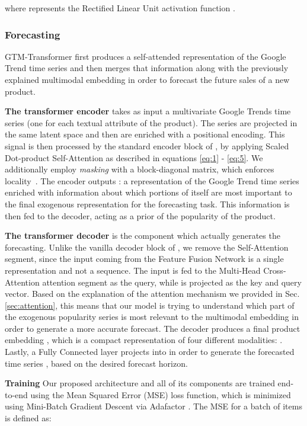 \documentclass{article}
\newcommand{\approachname}[0] {GTM-Transformer\xspace}
\begin{document}
where  represents the Rectified Linear Unit activation function \cite{agarap_relu}.


\subsubsection{Forecasting}
\approachname{} first produces a self-attended representation of the Google Trend time series and then merges that information along with the previously explained multimodal embedding in order to forecast the future sales of a new product.

\textbf{The transformer encoder} takes as input a multivariate Google Trends time series (one for each textual attribute of the product). The series are projected in the same latent space  and then are enriched with a positional encoding. This signal is then processed by the standard encoder block of \cite{vaswani2017attention}, by applying Scaled Dot-product Self-Attention as described in equations \ref{eq:1} - \ref{eq:5}. We additionally employ \emph{masking} with a block-diagonal matrix, which enforces locality~\cite{rae-razavi-2020-transformers}. The encoder outputs : a representation of the Google Trend time series enriched with information about which portions of itself are most important to the final exogenous representation for the forecasting task. This information is then fed to the decoder, acting as a prior of the popularity of the product.

\textbf{The transformer decoder} is the component which actually generates the forecasting. Unlike the vanilla decoder block of \cite{vaswani2017attention}, we remove the Self-Attention segment, since the input coming from the Feature Fusion Network is a single representation and not a sequence. The input is fed to the Multi-Head Cross-Attention attention segment as the query, while  is projected as the key and query vector. Based on the explanation of the attention mechanism we provided in  Sec. \ref{sec:attention}, this means that our model is trying to understand which part of the exogenous popularity series is most relevant to the multimodal embedding in order to generate a more accurate forecast. The decoder produces a final product embedding , which is a compact representation of four different modalities: . Lastly, a Fully Connected layer projects  into  in order to generate the forecasted time series , based on the desired forecast horizon. 

\textbf{Training}
Our proposed architecture and all of its components are trained end-to-end using the Mean Squared Error (MSE) loss function, which is minimized using Mini-Batch Gradient Descent via Adafactor \cite{shazeer2018adafactor}. The MSE for a batch of  items is defined as:
\end{document}
